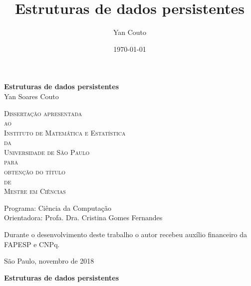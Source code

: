 \documentclass[11pt,oneside,a4paper, openany]{book}
\title{Estruturas de dados persistentes}
\author{Yan Couto}
\date{\today}
\begin{document}
\frontmatter

\thispagestyle{empty}
\begin{center}
    \vspace*{2.3cm}
    \textbf{\Large{Estruturas de dados persistentes}}\\

    \vspace*{1.2cm}
    \Large{Yan Soares Couto}

    \vskip 2cm
    \textsc{
    Dissertação apresentada\\[-0.25cm] 
    ao\\[-0.25cm]
    Instituto de Matemática e Estatística\\[-0.25cm]
    da\\[-0.25cm]
    Universidade de São Paulo\\[-0.25cm]
    para\\[-0.25cm]
    obtenção do título\\[-0.25cm]
    de\\[-0.25cm]
    Mestre em Ciências}

    \vskip 1.5cm
    Programa: Ciência da Computação\\
    Orientadora: Profa. Dra. Cristina Gomes Fernandes

    \vskip 1cm
    \normalsize{Durante o desenvolvimento deste trabalho o autor recebeu auxílio
    financeiro da FAPESP e CNPq.}

    \vskip 0.5cm
    \normalsize{São Paulo, novembro de 2018}
\end{center}

%
%
%
\newpage
\thispagestyle{empty}
    \begin{center}
        \vspace*{2.3 cm}
        \textbf{\Large{Estruturas de dados persistentes}}\\
        \vspace*{2 cm}
    \end{center}
\end{document}
